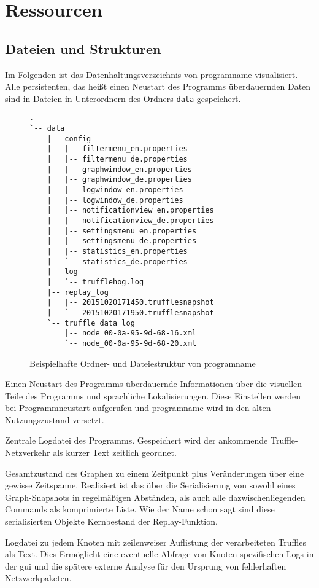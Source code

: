 \chapter{Ressourcen}
\section{Dateien und Strukturen}
Im Folgenden ist das Datenhaltungsverzeichnis von \gls{programname} visualisiert. Alle persistenten, das heißt einen Neustart des Programms überdauernden Daten sind in Dateien in Unterordnern des Ordners \texttt{data} gespeichert.
\begin{figure}[htb]
  \centering
\begin{verbatim}
.
`-- data
    |-- config
    |   |-- filtermenu_en.properties
    |   |-- filtermenu_de.properties
    |   |-- graphwindow_en.properties
    |   |-- graphwindow_de.properties
    |   |-- logwindow_en.properties
    |   |-- logwindow_de.properties
    |   |-- notificationview_en.properties
    |   |-- notificationview_de.properties
    |   |-- settingsmenu_en.properties
    |   |-- settingsmenu_de.properties
    |   |-- statistics_en.properties
    |   `-- statistics_de.properties
    |-- log
    |   `-- trufflehog.log
    |-- replay_log
    |   |-- 20151020171450.trufflesnapshot
    |   `-- 20151020171950.trufflesnapshot
    `-- truffle_data_log
        |-- node_00-0a-95-9d-68-16.xml
        `-- node_00-0a-95-9d-68-20.xml
\end{verbatim}
  \caption[Ordner- und Dateiestruktur von \gls{programname}]{Beispielhafte Ordner- und Dateiestruktur von \gls{programname}}
\end{figure}

\begin{description}[style=multiline, leftmargin=3.3cm, labelwidth=3.3cm]
\item[\texttt{config}] Einen Neustart des Programms überdauernde Informationen über die visuellen Teile des Programms und sprachliche Lokalisierungen. Diese Einstellen werden bei Programmneustart aufgerufen und \gls{programname} wird in den alten Nutzungszustand versetzt.
\item[\texttt{log}] Zentrale Logdatei des Programms. Gespeichert wird der ankommende Truffle-Netzverkehr als kurzer Text zeitlich geordnet.
\item[\texttt{replay\_log}] Gesamtzustand des Graphen zu einem Zeitpunkt plus Veränderungen über eine gewisse Zeitspanne. Realisiert ist das über die Serialisierung von sowohl eines Graph-Snapshots in regelmäßigen Abständen, als auch alle dazwischenliegenden Commands als komprimierte Liste. Wie der Name schon sagt sind diese serialisierten Objekte Kernbestand der Replay-Funktion.
\item[\texttt{truffle\_data\_log}] Logdatei zu jedem Knoten mit zeilenweiser Auflistung der verarbeiteten Truffles als Text. Dies Ermöglicht eine eventuelle Abfrage von Knoten-spezifischen Logs in der \gls{gui} und die spätere externe Analyse für den Ursprung von fehlerhaften Netzwerkpaketen.
\end{description}

